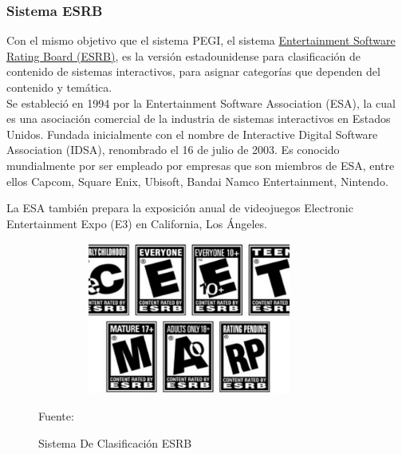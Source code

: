 \subsubsection{Sistema ESRB}

Con el mismo objetivo que el sistema PEGI, el sistema \href{https://www.esrb.org/}{Entertainment Software Rating Board (ESRB)}, es la versión estadounidense para clasificación de contenido de sistemas interactivos, para asignar categorías que dependen del contenido y temática. 
\\
Se estableció en 1994 por la Entertainment Software Association (ESA), la cual es una asociación comercial de la industria de sistemas interactivos en Estados Unidos. Fundada inicialmente con el nombre de Interactive Digital Software Association (IDSA), renombrado el 16 de julio de 2003. Es conocido mundialmente por ser empleado por empresas que son miembros de ESA, entre ellos Capcom, Square Enix, Ubisoft, Bandai Namco Entertainment, Nintendo. 

La ESA también prepara la exposición anual de videojuegos Electronic Entertainment Expo (E3) en California, Los Ángeles.

\begin{figure}[t!]
	\centering
	\includegraphics[width=10cm,height=5cm,]{./Images/esrb.jpg}
	\caption{Sistema De Clasificación ESRB}
	\footnotesize Fuente: \cite{esrb}
	\label{esrb}
\end{figure}

